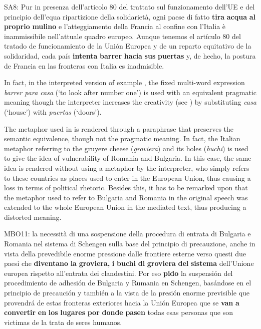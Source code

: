 \documentclass[output=paper]{langscibook}
\begin{document}
\ea\label{ex:mori:23}
\ea
SA8: Pur in presenza dell'articolo 80 del trattato sul funzionamento dell'UE e del principio dell'equa ripartizione della solidarietà, ogni paese di fatto \textbf{tira} \textbf{acqua} \textbf{al} \textbf{proprio} \textbf{mulino} e l'atteggiamento della Francia al confine con l'Italia è inammissibile nell'attuale quadro europeo.
\ex
Aunque tenemos el artículo 80 del tratado de funcionamiento de la Unión Europea y de un reparto equitativo de la solidaridad, cada país \textbf{intenta} \textbf{barrer} \textbf{hacia} \textbf{sus} \textbf{puertas} y, de hecho, la postura de Francia en las fronteras con Italia es inadmisible.
\z
\z

In fact, in the interpreted version of example , the fixed multi-word expression \textit{barrer para casa} (‘to look after number one’) is used with an equivalent pragmatic meaning though the interpreter increases the creativity (see \citealt[21]{Semino2008}) by substituting \textit{casa} (‘house’) with \textit{puertas} (‘doors’).

The metaphor used in  is rendered through a paraphrase that preserves the semantic equivalence, though not the pragmatic meaning. In fact, the Italian metaphor referring to the gruyere cheese (\textit{groviera}) and its holes (\textit{buchi}) is used to give the idea of vulnerability of Romania and Bulgaria. In this case, the same idea is rendered without using a metaphor by the interpreter, who simply refers to these countries as places used to enter in the European Union, thus causing a loss in terms of political rhetoric. Besides this, it has to be remarked upon that the metaphor used to refer to Bulgaria and Romania in the original speech was extended to the whole European Union in the mediated text, thus producing a distorted meaning.

\ea\label{ex:mori:24}
\ea
MBO11:  la necessità di una sospensione della procedura di entrata di Bulgaria e Romania nel sistema di Schengen sulla base del principio di precauzione, anche in vista della prevedibile enorme pressione dalle frontiere esterne verso questi due paesi che \textbf{diventano} \textbf{la} \textbf{groviera,} \textbf{i} \textbf{buchi} \textbf{di} \textbf{groviera} \textbf{del} \textbf{sistema} dell'Unione europea rispetto all'entrata dei clandestini.
\ex
Por eso \textbf{pido} la suspensión del procedimiento de adhesión de Bulgaria y Rumania en Schengen, basándose en el principio de precaución y también a la vista de la presión enorme previsible que provendrá de estas fronteras exteriores hacia la Unión Europea que se \textbf{van} \textbf{a} \textbf{convertir} \textbf{en} \textbf{los} \textbf{lugares} \textbf{por} \textbf{donde} \textbf{pasen} todas esas personas que son victimas de la trata de seres humanos.
\z
\z
\end{document}
